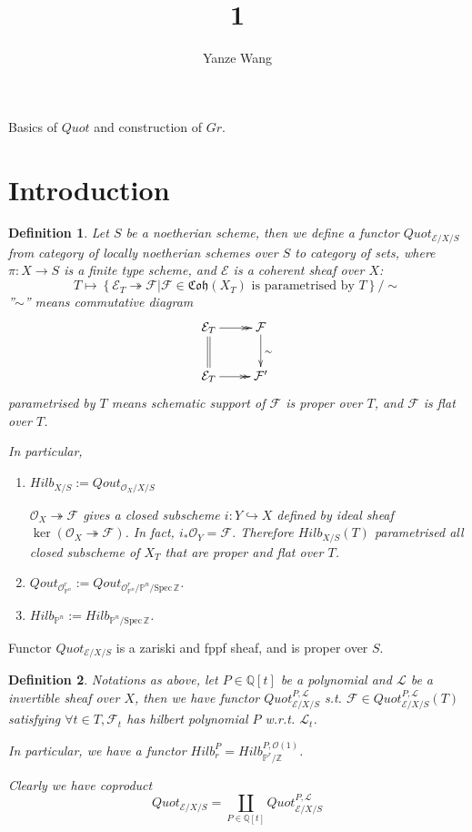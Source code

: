 \documentclass{article}
\title{1}
\author{Yanze Wang}
\date{}
\newtheorem{defn}{Definition}[section]
\newcommand{\Spec}{\mathrm{Spec}\,}
\begin{document}
\maketitle
Basics of $ Quot $ and construction of $ Gr $.
\section{Introduction}
\begin{defn}
	Let $ S $ be a \emph{noetherian} scheme, then we define a functor  $ Quot_{\mathcal{E}/X/S} $ from category of \emph{locally noetherian schemes} over $ S $ to category of sets, where $ \pi:X\to S $ is a finite type scheme, and $ \mathcal{E} $ is a coherent sheaf over $ X $:
	$$ T\mapsto \left\{ \mathcal{E}_T\twoheadrightarrow \mathcal{F} | \mathcal{F}\in \mathfrak{Coh}(X_T)  \text{ is parametrised by } T \right\}/\sim $$
	''$ \sim $'' means commutative diagram
	$$ \xymatrix{
		\mathcal{E}_T\ar@{->>}[r]\ar@{=}[d]&\mathcal{F}\ar[d]^{\sim}\\
		\mathcal{E}_T\ar@{->>}[r]&\mathcal{F}'\\
	} $$
	parametrised by $ T $ means schematic support of $ \mathcal{F} $ is proper over $ T $, and $ \mathcal{F} $ is flat over $ T $.
	
	In particular,
	\begin{enumerate}
		\item $ Hilb_{X/S}:=Qout_{\mathcal{O}_X/X/S} $
		
		$ \mathcal{O}_X\twoheadrightarrow \mathcal{F} $ gives a closed subscheme $ i:Y\hookrightarrow X $ defined by ideal sheaf $ \ker (\mathcal{O}_X\twoheadrightarrow \mathcal{F}) $. In fact, $ i_*\mathcal{O}_Y=\mathcal{F} $. Therefore $ Hilb_{X/S}(T) $ parametrised all closed subscheme of $ X_T $ that are proper and flat over $ T $.
		\item $ Qout_{\mathcal{O}_{\mathbb{P}^n}^r}:=Qout_{\mathcal{O}_{\mathbb{P}^n}^r / \mathbb{P}^n/\Spec \mathbb{Z}} $.
		\item $ Hilb_{\mathbb{P}^n}:=Hilb_{\mathbb{P}^n/\Spec \mathbb{Z}} $.
	\end{enumerate}
\end{defn}

Functor $ Quot_{\mathcal{E}/X/S} $ is a zariski and fppf sheaf, and is proper over $ S $.

\begin{defn}
	Notations as above, let $ P\in \mathbb{Q}[t] $ be a polynomial and $ \mathcal{L} $ be a invertible sheaf over $ X $, then we have functor $ Quot_{\mathcal{E}/X/S}^{P,\mathcal{L}} $ s.t. $ \mathcal{F}\in Quot_{\mathcal{E}/X/S}^{P,\mathcal{L}}(T)  $ satisfying $ \forall t\in T, \mathcal{F}_t $ has hilbert polynomial $ P $ w.r.t. $ \mathcal{L}_t $.
	
	In particular, we have a functor $ Hilb^P_r=Hilb^{P,\mathcal{O}(1)}_{\mathbb{P}^r/\mathbb{Z}} $.
	
	Clearly we have coproduct
	$$ Quot_{\mathcal{E}/X/S}=\coprod_{P\in \mathbb{Q}[t]} Quot_{\mathcal{E}/X/S}^{P,\mathcal{L}}  $$
\end{defn}
\end{document}

